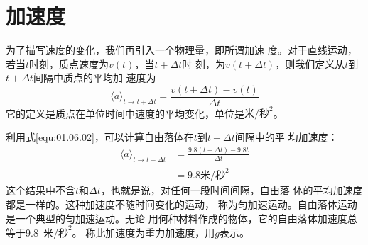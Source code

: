 \section{加速度}\label{sec:01.08}

为了描写速度的变化，我们再引入一个物理量，即所谓加速
度。对于直线运动，若当$t$时刻，质点速度为$v(t)$，$当t+\Delta t$时
刻，为$v(t+\Delta t)$，则我们定义从$t$到$t+\Delta t$间隔中质点的平均加
速度为
\begin{equation}\label{equ:01.08.01}
    \langle a\rangle_{t\rightarrow t+\Delta t} = \frac{v(t+\Delta t)-v(t)}{\Delta t}
\end{equation}
它的定义是质点在单位时间中速度的平均变化，单位是$\text{米/秒}^2$。

利用式\eqref{equ:01.06.02}，可以计算自由落体在$t$到$t+\Delta t$间隔中的平
均加速度：
\begin{equation*}
    \begin{aligned}
    \langle a\rangle_{t\rightarrow t+\Delta t} &= \frac{9.8(t+\Delta t)-9.8t}{\Delta t} \\
    &= 9.8\text{米/秒}^2
    \end{aligned}
\end{equation*}
这个结果中不含$t$和$\Delta t$，也就是说，对任何一段时间间隔，自由落
体的平均加速度都是一样的。这种加速度不随时间变化的运动，
称为匀加速运动。自由落体运动是一个典型的匀加速运动。无论
用何种材料作成的物体，它的自由落体加速度总等于9.8~$\text{米/秒}^2$。
称此加速度为重力加速度，用$g$表示。

